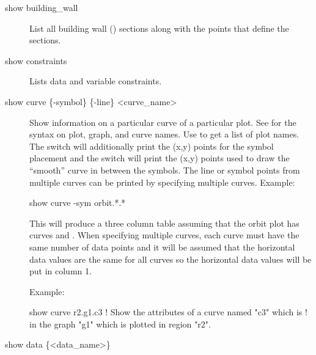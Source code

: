 {{{\begin{description}

\item[show building_wall] \Newline

\vskip -0.2in 

List all building wall () sections
along with the points that define the sections.


\item[show constraints] \Newline

\vskip -0.2in

Lists data and variable constraints.


\item[show curve \{-symbol\} \{-line\} <curve\_name>] \Newline

\vskip -0.2in

Show information on a particular curve of a particular plot. See
 for the syntax on plot, graph, and curve names.  Use
 to get a list of plot names. The  switch
will additionally print the (x,y) points for the symbol placement and
the  switch will print the (x,y) points used to draw the
``smooth'' curve in between the symbols. The line or symbol points
from multiple curves can be printed by specifying multiple curves. Example:
\begin{example}
  show curve -sym orbit.*.*
\end{example}
This will produce a three column table assuming that the orbit plot
has curves  and . When specifying
multiple curves, each curve must have the same number of data points
and it will be assumed that the horizontal data values are the same
for all curves so the horizontal data values will be put in column 1.

Example:
\begin{example}
  show curve r2.g1.c3     ! Show the attributes of a curve named "c3" which is 
                          !   in the graph "g1" which is plotted in region "r2".
\end{example}


\item[show data \{<data\_name>\}] \Newline


\end{description}}}}
